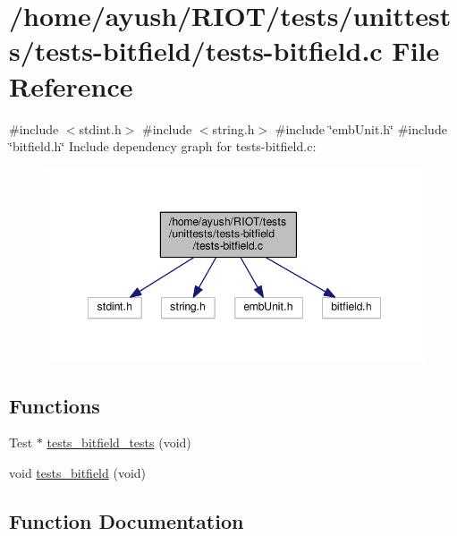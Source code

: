 \hypertarget{tests-bitfield_8c}{}\section{/home/ayush/\+R\+I\+O\+T/tests/unittests/tests-\/bitfield/tests-\/bitfield.c File Reference}
\label{tests-bitfield_8c}
{\ttfamily \#include $<$stdint.\+h$>$}\newline
{\ttfamily \#include $<$string.\+h$>$}\newline
{\ttfamily \#include \char`\"{}emb\+Unit.\+h\char`\"{}}\newline
{\ttfamily \#include \char`\"{}bitfield.\+h\char`\"{}}\newline
Include dependency graph for tests-\/bitfield.c\+:
\nopagebreak
\begin{figure}[H]
\begin{center}
\leavevmode
\includegraphics[width=348pt]{tests-bitfield_8c__incl}
\end{center}
\end{figure}
\subsection*{Functions}
\begin{DoxyCompactItemize}
\item 
Test $\ast$ \hyperlink{tests-bitfield_8c_af7a63bf115b3e6b73da561edfe0a0fb3}{tests\+\_\+bitfield\+\_\+tests} (void)
\item 
void \hyperlink{tests-bitfield_8c_a6711f20f2fab4829ace17f5af4448ca3}{tests\+\_\+bitfield} (void)
\end{DoxyCompactItemize}


\subsection{Function Documentation}
\mbox{\label{tests-bitfield_8c_a6711f20f2fab4829ace17f5af4448ca3}} 
